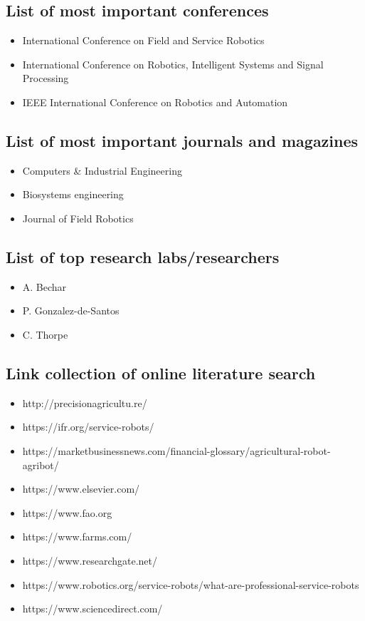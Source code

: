     \subsection{List of most important conferences}
    \begin{itemize}
        \item International Conference on Field and Service Robotics
        \item International Conference on Robotics, Intelligent Systems and Signal Processing
        \item IEEE International Conference on Robotics and Automation
    \end{itemize}
    \subsection{List of most important journals and magazines}
    \begin{itemize}
        \item Computers {\&} Industrial Engineering
        \item Biosystems engineering
        \item Journal of Field Robotics
    \end{itemize}
    \subsection{List of top research labs/researchers}
    \begin{itemize}
        \item A. Bechar 
        \item P. Gonzalez-de-Santos
        \item C. Thorpe 
    \end{itemize}
    \subsection{Link collection of online literature search}
    \begin{itemize}
        \item http://precisionagricultu.re/
        \item https://ifr.org/service-robots/
        \item https://marketbusinessnews.com/financial-glossary/agricultural-robot-agribot/
        \item https://www.elsevier.com/
        \item https://www.fao.org
        \item https://www.farms.com/
        \item https://www.researchgate.net/
        \item https://www.robotics.org/service-robots/what-are-professional-service-robots
        \item https://www.sciencedirect.com/
    \end{itemize}

